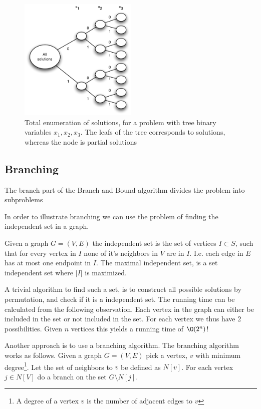 \documentclass[10pt]{article}
\begin{document}
\begin{figure}[ht]
\centering
\includegraphics[width=0.5\textwidth]{figures/fig21.pdf}
\caption{Total enumeration of solutions, for a problem with tree binary variables $x_1, x_2, x_3$. The leafs of the tree corresponds to solutions, whereas the node is partial solutions}
\label{fig21}
\end{figure}

\subsection{Branching} %
\label{sub:branching}
The branch part of the Branch and Bound algorithm divides the problem into subproblems

In order to illustrate branching we can use the problem of finding the independent set in a graph. 

Given a graph $G = (V,E)$ the independent set is the set of vertices $I \subset S$, such that for every vertex in $I$ none of it's neighbors in $V$ are in $I$. I.e. each edge in $E$ has at most one endpoint in $I$. The maximal independent set, is a set independent set where $|I|$ is maximized.

A trivial algorithm to find such a set, is to construct all possible solutions by permutation, and check if it is a independent set. The running time can be calculated from the following observation. Each vertex in the graph can either be included in the set or not included in the set. For each vertex we thus have 2 possibilities. Given $n$ vertices this yields a running time of $\O(2^n)$!

Another approach is to use a branching algorithm. The branching algorithm works as follows. Given a graph $G = (V,E)$ pick a vertex, $v$ with minimum degree\footnote{A degree of a vertex $v$ is the number of adjacent edges to $v$}. Let the set of neighbors to $v$ be defined as $N[v]$. For each vertex $j \in N[V]$ do a branch on the set $G \setminus N[j]$.
\end{document}
